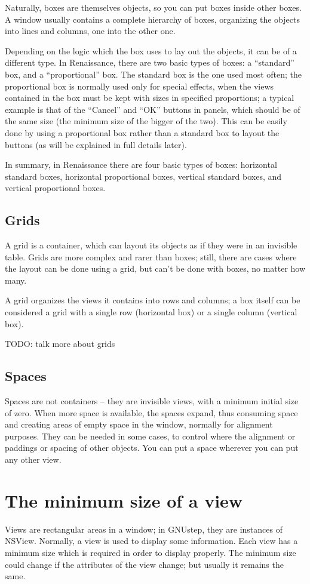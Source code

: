 Naturally, boxes are themselves objects, so you can put boxes inside
other boxes.  A window usually contains a complete hierarchy of boxes,
organizing the objects into lines and columns, one into the other one.

Depending on the logic which the box uses to lay out the objects, it
can be of a different type.  In Renaissance, there are two basic types of
boxes: a ``standard'' box, and a ``proportional'' box.  The standard
box is the one used most often; the proportional box is normally used
only for special effects, when the views contained in the box must be
kept with sizes in specified proportions; a typical example is that of
the ``Cancel'' and ``OK'' buttons in panels, which should be of the
same size (the minimum size of the bigger of the two).  This can be
easily done by using a proportional box rather than a standard box to
layout the buttons (as will be explained in full details later).

In summary, in Renaissance there are four basic types of boxes:
horizontal standard boxes, horizontal proportional boxes, vertical
standard boxes, and vertical proportional boxes.

\subsection{Grids}
A grid is a container, which can layout its objects as if they were in
an invisible table.  Grids are more complex and rarer than boxes;
still, there are cases where the layout can be done using a grid, but
can't be done with boxes, no matter how many.

A grid organizes the views it contains into rows and columns; a box
itself can be considered a grid with a single row (horizontal box) or
a single column (vertical box).

TODO: talk more about grids

\subsection{Spaces}
Spaces are not containers -- they are invisible views, with a minimum
initial size of zero.  When more space is available, the spaces
expand, thus consuming space and creating areas of empty space in the
window, normally for alignment purposes.  They can be needed in some
cases, to control where the alignment or paddings or spacing of other
objects.  You can put a space wherever you can put any other view.

\section{The minimum size of a view}
Views are rectangular areas in a window; in GNUstep, they are
instances of NSView.  Normally, a view is used to display some
information.  Each view has a minimum size which is required in order
to display properly.  The minimum size could change if the attributes
of the view change; but usually it remains the same.

